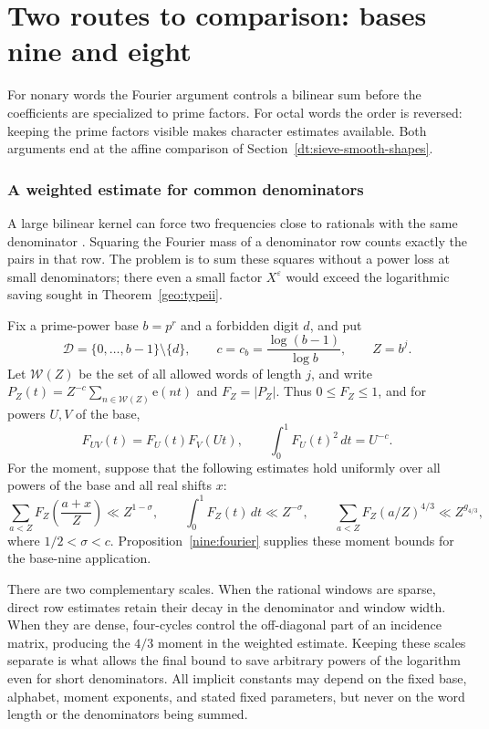 \documentclass[11pt,a4paper]{article}
\theoremstyle{paperplain}
\numberwithin{equation}{section}
\begin{document}
\clearpage
\part{Two routes to comparison: bases nine and eight}\label{part:geom}
For nonary words the Fourier argument controls a bilinear sum before
the coefficients are specialized to prime factors. For octal words
the order is reversed: keeping the prime factors visible makes
character estimates available. Both arguments end at the affine
comparison of Section~\ref{dt:sieve-smooth-shapes}.

\section{A weighted estimate for common denominators}\label{geo:section}

A large bilinear kernel can force two frequencies close to rationals with
the same denominator \cite[Lemmas~13.2 and~14.1]{Maynard2019}. Squaring
the Fourier mass of a denominator row counts exactly the pairs in that
row. The problem is to sum these squares without a power loss at small
denominators; there even a small factor $X^\varepsilon$ would exceed
the logarithmic saving sought in Theorem~\ref{geo:typeii}.

Fix a prime-power base $b=p^r$ and a forbidden digit $d$, and put
\[
 \mathcal D=\{0,\ldots,b-1\}\setminus\{d\},\qquad
 c=c_b=\frac{\log(b-1)}{\log b},\qquad Z=b^j.
\]
Let $\mathcal W(Z)$ be the set of all allowed words of length $j$, and write
$P_Z(t)=Z^{-c}\sum_{n\in\mathcal W(Z)}\mathrm e(nt)$ and $F_Z=|P_Z|$.
Thus $0\le F_Z\le1$, and for powers $U,V$ of the base,
\begin{equation}\label{geo:product}
 F_{UV}(t)=F_U(t)F_V(Ut),\qquad
 \int_0^1 F_U(t)^2\,dt=U^{-c}.
\end{equation}
For the moment, suppose that the following estimates hold uniformly over all
powers of the base and all real shifts $x$:
\begin{equation}\label{geo:moments}
 \sum_{a<Z}F_Z\left(\frac{a+x}{Z}\right)\ll Z^{1-\sigma},
 \qquad \int_0^1F_Z(t)\,dt\ll Z^{-\sigma},
 \qquad \sum_{a<Z}F_Z(a/Z)^{4/3}\ll Z^{g_{4/3}},
\end{equation}
where $1/2<\sigma<c$. Proposition~\ref{nine:fourier} supplies these
moment bounds for the base-nine application.

There are two complementary scales. When the rational windows are sparse,
direct row estimates retain their decay in the denominator and window width.
When they are dense, four-cycles control the off-diagonal part of an incidence
matrix, producing the $4/3$ moment in the weighted estimate. Keeping these
scales separate is what allows the final bound to save arbitrary powers of
the logarithm even for short denominators. All implicit constants may depend
on the fixed base, alphabet, moment exponents, and stated fixed parameters,
but never on the word length or the denominators being summed.
\end{document}
